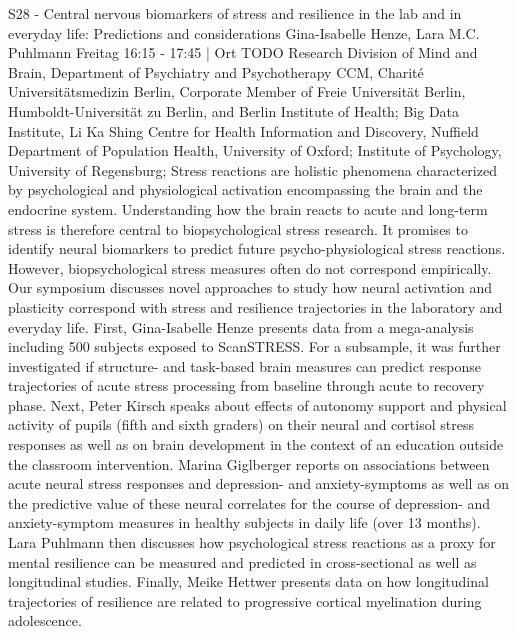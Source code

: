 
            \begin{symposium}
            {S28 - Central nervous biomarkers of stress and resilience in the lab and in everyday life: Predictions and considerations }
            {Gina-Isabelle Henze, Lara M.C. Puhlmann}
            {Freitag 16:15 - 17:45 | Ort TODO}
            {Research Division of Mind and Brain, Department of Psychiatry and Psychotherapy CCM, Charité Universitätsmedizin Berlin, Corporate Member of Freie Universität Berlin, Humboldt-Universität zu Berlin, and Berlin Institute of Health; Big Data Institute, Li Ka Shing Centre for Health Information and Discovery, Nuffield Department of Population Health, University of Oxford; Institute of Psychology, University of Regensburg;}
            Stress reactions are holistic phenomena characterized by psychological and physiological activation encompassing the brain and the endocrine system. Understanding how the brain reacts to acute and long-term stress is therefore central to biopsychological stress research. It promises to identify neural biomarkers to predict future psycho-physiological stress reactions. However, biopsychological stress measures often do not correspond empirically. Our symposium discusses novel approaches to study how neural activation and plasticity correspond with stress and resilience trajectories in the laboratory and everyday life.
First, Gina-Isabelle Henze presents data from a mega-analysis including 500 subjects exposed to ScanSTRESS. For a subsample, it was further investigated if structure- and task-based brain measures can predict response trajectories of acute stress processing from baseline through acute to recovery phase.
Next, Peter Kirsch speaks about effects of autonomy support and physical activity of pupils (fifth and sixth graders) on their neural and cortisol stress responses as well as on brain development in the context of an education outside the classroom intervention.
Marina Giglberger reports on associations between acute neural stress responses and depression- and anxiety-symptoms as well as on the predictive value of these neural correlates for the course of depression- and anxiety-symptom measures in healthy subjects in daily life (over 13 months).
Lara Puhlmann then discusses how psychological stress reactions as a proxy for mental resilience can be measured and predicted in cross-sectional as well as longitudinal studies.
Finally, Meike Hettwer presents data on how longitudinal trajectories of resilience are related to progressive cortical myelination during adolescence.
            \begin{description}    
            

\end{description}
\end{symposium}
